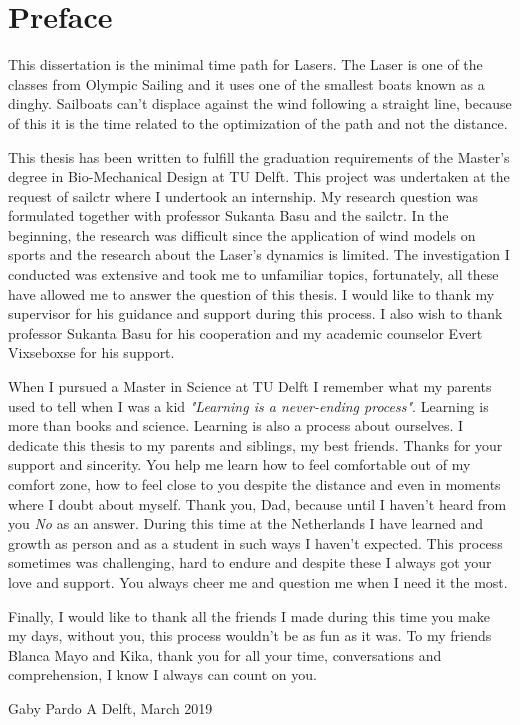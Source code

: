 \chapter*{Preface}

This dissertation is the minimal time path for Lasers. The Laser is one of the classes from Olympic Sailing and it uses one of the smallest boats known as a dinghy. Sailboats can't displace against the wind following a straight line, because of this it is the time related to the optimization of the path and not the distance.  \par 

This thesis has been written to fulfill the graduation requirements of the Master's degree in Bio-Mechanical Design at TU Delft. This project was undertaken at the request of \acrlong{sailctr} where I undertook an internship. My research question was formulated together with professor Sukanta Basu and the \acrshort{sailctr}. In the beginning, the research was difficult since the application of wind models on sports and the research about the Laser's dynamics is limited. The investigation I conducted was extensive and took me to unfamiliar topics, fortunately, all these have allowed me to answer the question of this thesis. I would like to thank my supervisor for his guidance and support during this process. I also wish to thank professor Sukanta Basu for his cooperation and my academic counselor Evert Vixseboxse for his support. \par 

When I pursued a Master in Science at TU Delft I remember what my parents used to tell when I was a kid \textit{"Learning is a never-ending process"}. Learning is more than books and science. Learning is also a process about ourselves. I dedicate this thesis to my parents and siblings, my best friends. Thanks for your support and sincerity. You help me learn how to feel comfortable out of my comfort zone, how to feel close to you despite the distance and even in moments where I doubt about myself. Thank you, Dad, because until I haven't heard from you \textit{No} as an answer. During this time at the Netherlands I have learned and growth as person and as a student in such ways I haven't expected. This process sometimes was challenging, hard to endure and despite these I always got your love and support. You always cheer me and question me when I need it the most. \par 
Finally, I would like to thank all the friends I made during this time you make my days, without you, this process wouldn't be as fun as it was. To my friends Blanca Mayo and Kika, thank you for all your time, conversations and comprehension, I know I always can count on you.\par
\begin{flushright}
Gaby Pardo A  \break
Delft, March 2019
\end{flushright}

